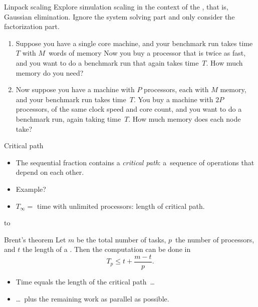 \begin{exercise}{Linpack scaling}
  \label{ex:scal-linpack}
  Explore simulation scaling in the context of the
  ,
  that is, Gaussian elimination.
  Ignore the system solving part and
  only consider the factorization part.
  \begin{enumerate}
  \item Suppose you have a single core machine, 
    and your benchmark run takes time~$T$ with $M$~words of memory
    Now you buy a processor that is twice as fast, and you want to do a
    benchmark run that again takes time~$T$. How much memory do you need?
  \item Now suppose you have a machine with $P$ processors,
    each with $M$ memory, and your benchmark run takes time~$T$.
    You buy a machine with $2P$ processors, of the same clock speed
    and core count, and you want to do a benchmark run, again
    taking time~$T$. How much memory does each node take?
  \end{enumerate}
\end{exercise}

\begin{numberedframe}{Critical path}
  \begin{itemize}
  \item The sequential fraction contains a \textsl{critical path}:
    a~sequence of operations that depend on each other.
  \item Example?
  \item $T_\infty=$ time with unlimited processors: length of critical path.
  \end{itemize}
  \hbox to 
\end{numberedframe}

\begin{numberedframe}{Brent's theorem}
    Let $m$ be the total number of tasks, $p$~the number of processors,
  and $t$ the length of a . Then
  the computation can be done in \[ T_p \leq t +\frac{m-t}{p}. \]

  \begin{itemize}
  \item Time equals the length of the critical path~\ldots
  \item \ldots~plus the remaining work as parallel as possible.
  \end{itemize}
\end{numberedframe}

